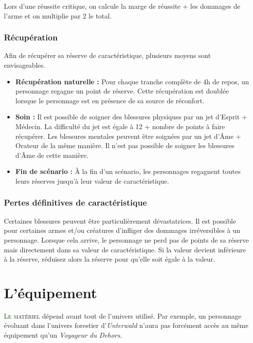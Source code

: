 \documentclass[twoside,12pt,english]{book}
\newcommand*\initfamily{\usefont{U}{Acorn}{xl}{n}}
\begin{document}
Lors d'une réussite critique, on calcule la marge de réussite + les dommages de l'arme et on multiplie par 2 le total.

\subsubsection*{Récupération}

Afin de récupérer sa réserve de caractéristique, plusieurs moyens sont envisageables.

\begin{itemize}
\item \textbf{Récupération naturelle :} Pour chaque tranche complète de 4h de repos, un personnage regagne un point de réserve. Cette récupération est doublée lorsque le personnage est en présence de sa source de réconfort.
\item \textbf{Soin :} Il est possible de soigner des blessures physiques par un jet d'Esprit + Médecin. La difficulté du jet est égale à 12 + nombre de points à faire récupérer. Les blessures mentales peuvent être soignées par un jet d'Âme + Orateur de la même manière. Il n'est pas possible de soigner les blessures d'Âme de cette manière.
\item \textbf{Fin de scénario :} À la fin d'un scénario, les personnages regagnent toutes leurs réserves jusqu'à leur valeur de caractéristique.
\end{itemize}

\subsubsection*{Pertes définitives de caractéristique}

Certaines blessures peuvent être particulièrement dévastatrices. Il est possible pour certaines armes et/ou créatures d'infliger des dommages irréversibles à un personnage. Lorsque cela arrive, le personnage ne perd pas de points de sa réserve mais directement dans sa valeur de caractéristique. Si la valeur devient inférieure à la réserve, réduisez alors la réserve pour qu'elle soit égale à la valeur.

\newpage

\section{L'équipement}

\lettrine[lines=3]{\initfamily\textcolor{darkgreen}{L}}{e matériel} dépend avant tout de l'univers utilisé. Par exemple, un personnage évoluant dans l'univers forestier d'\emph{Unterwald} n'aura pas forcément accès au même équipement qu'un \emph{Voyageur du Dehors}.
\end{document}
